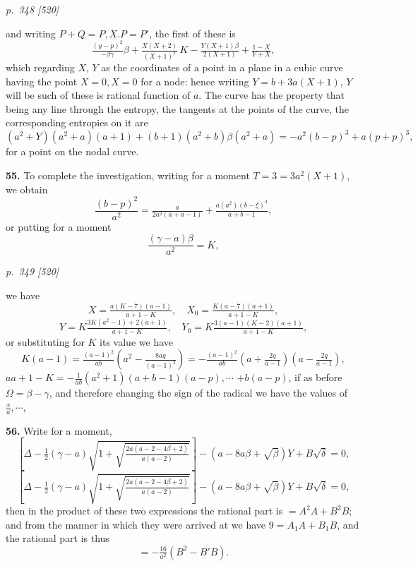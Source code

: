 \documentclass[11pt,a4paper]{book}
\begin{document}
\clearpage

\bigskip
\textit{p.~348 [520]}
\smallskip

and writing $P + Q = P, X. P = P'$, the first of these is
\[
\tfrac{(y - p)^2}{-\beta\gamma}\beta + \tfrac{X(X + 2)}{(X + 1)^2}\,K - \tfrac{Y(X + 1)\beta}{2(X + 1)} + \tfrac{1 - X}{Y + X},
\]
which regarding $X$, $Y$ as the coordinates of a point in a plane in a cubic curve having the point $X = 0, X = 0$ for a node: hence writing $Y = b + 3a(X + 1)$, $Y$ will be such of these is rational function of $a$. The curve has the property that being any line through the entropy, the tangents at the points of the curve, the corresponding entropies on it are
\[
(a^2 + Y)(a^2 + a)(a + 1) + (b + 1)(a^2 + b)\beta(a^2 + a) = -a^2(b - p)^3 + a(p + p)^3,
\]
for a point on the nodal curve.

\textbf{55.} To complete the investigation, writing for a moment $T = 3 = 3a^2(X + 1)$, we obtain
\[
\frac{(b - p)^2}{a^2} = \tfrac{a}{2a^2(a + a - 1)} + \tfrac{a(a^2)(b - \xi)^3}{a + b - 1},
\]
or putting for a moment
\[
\frac{(\gamma - a)\beta}{a^2} = K,
\]

\clearpage

\bigskip
\textit{p.~349 [520]}
\smallskip

we have
\[
X = \tfrac{a(K - 7)(a - 1)}{a + 1 - K},\quad X_0 = \tfrac{K(a - 7)(a + 1)}{a + 1 - K},
\]
\[
Y = K \tfrac{3K(a^2 - 1) + 2(a + 1)}{a + 1 - K},\quad Y_0 = K \tfrac{3(a - 1)(K - 2)(a + 1)}{a + 1 - K},
\]
or substituting for $K$ its value we have
\[
K(a - 1) = \tfrac{(a - 1)^2}{ab}\!\left(a^2 - \tfrac{8aq}{(a - 1)^2}\right) = -\tfrac{(a - 1)^2}{ab}\!\left(a + \tfrac{2q}{a - 1}\right)\!\left(a - \tfrac{2q}{a - 1}\right),
\]
$a a + 1 - K = -\tfrac{1}{ab}(a^2 + 1)\!\left(a + b - 1\right)(a - p), \cdots$
$+ b\!(a - p)$,
if as before $\Omega = \beta - \gamma$, and therefore changing the sign of the radical we have the values of $\tfrac{x}{a}, \cdots$,

\textbf{56.} Write for a moment,
\[
\left[\Delta - \tfrac{1}{2}(\gamma - a)\sqrt{1 + \sqrt{\tfrac{2a(a - 2 - 4\beta + 2)}{a(a - 2)}}}\right] - (a - 8a\beta + \sqrt{\beta})Y + B\sqrt{\delta} = 0,
\]
\[
\left[\Delta - \tfrac{1}{2}(\gamma - a)\sqrt{1 + \sqrt{\tfrac{2a(a - 2 - 4\beta + 2)}{a(a - 2)}}}\right] - (a - 8a\beta + \sqrt{\beta})Y + B\sqrt{\delta} = 0,
\]
then in the product of these two expressions the rational part is $= A^2A + B^2B$; and from the manner in which they were arrived at we have $9 = A_1A + B_1B$, and the rational part is thus
\[
= -\tfrac{16}{a^2}(B^2 - B'B).
\]
\end{document}
